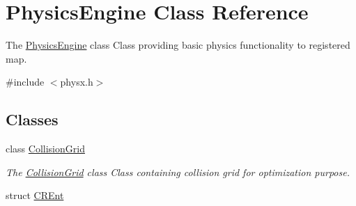 \hypertarget{classPhysicsEngine}{}\section{Physics\+Engine Class Reference}
\label{classPhysicsEngine}


The \hyperlink{classPhysicsEngine}{Physics\+Engine} class Class providing basic physics functionality to registered map.  




{\ttfamily \#include $<$physx.\+h$>$}

\subsection*{Classes}
\begin{DoxyCompactItemize}
\item 
class \hyperlink{classPhysicsEngine_1_1CollisionGrid}{Collision\+Grid}
\begin{DoxyCompactList}\small\item\em The \hyperlink{classPhysicsEngine_1_1CollisionGrid}{Collision\+Grid} class Class containing collision grid for optimization purpose. \end{DoxyCompactList}\item 
struct \hyperlink{structPhysicsEngine_1_1CREnt}{C\+R\+Ent}
\end{DoxyCompactItemize}
